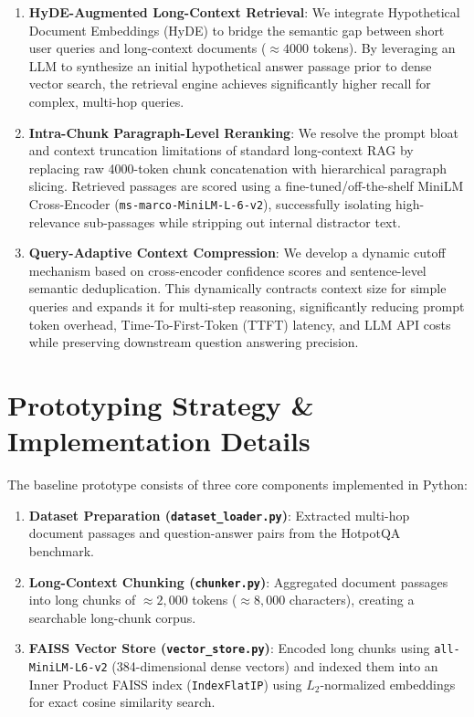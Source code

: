 \documentclass[11pt,a4paper]{article}
\begin{document}
\begin{enumerate}
    \item \textbf{HyDE-Augmented Long-Context Retrieval}: We integrate Hypothetical Document Embeddings (HyDE) to bridge the semantic gap between short user queries and long-context documents ($\approx 4000$ tokens). By leveraging an LLM to synthesize an initial hypothetical answer passage prior to dense vector search, the retrieval engine achieves significantly higher recall for complex, multi-hop queries.
    
    \item \textbf{Intra-Chunk Paragraph-Level Reranking}: We resolve the prompt bloat and context truncation limitations of standard long-context RAG by replacing raw 4000-token chunk concatenation with hierarchical paragraph slicing. Retrieved passages are scored using a fine-tuned/off-the-shelf MiniLM Cross-Encoder (\texttt{ms-marco-MiniLM-L-6-v2}), successfully isolating high-relevance sub-passages while stripping out internal distractor text.
    
    \item \textbf{Query-Adaptive Context Compression}: We develop a dynamic cutoff mechanism based on cross-encoder confidence scores and sentence-level semantic deduplication. This dynamically contracts context size for simple queries and expands it for multi-step reasoning, significantly reducing prompt token overhead, Time-To-First-Token (TTFT) latency, and LLM API costs while preserving downstream question answering precision.
\end{enumerate}

\section{Prototyping Strategy \& Implementation Details}
The baseline prototype consists of three core components implemented in Python:

\begin{enumerate}
    \item \textbf{Dataset Preparation (\texttt{dataset\_loader.py})}: Extracted multi-hop document passages and question-answer pairs from the HotpotQA benchmark.
    \item \textbf{Long-Context Chunking (\texttt{chunker.py})}: Aggregated document passages into long chunks of $\approx 2,000$ tokens ($\approx 8,000$ characters), creating a searchable long-chunk corpus.
    \item \textbf{FAISS Vector Store (\texttt{vector\_store.py})}: Encoded long chunks using \texttt{all-MiniLM-L6-v2} (384-dimensional dense vectors) and indexed them into an Inner Product FAISS index (\texttt{IndexFlatIP}) using $L_2$-normalized embeddings for exact cosine similarity search.
\end{enumerate}
\end{document}
